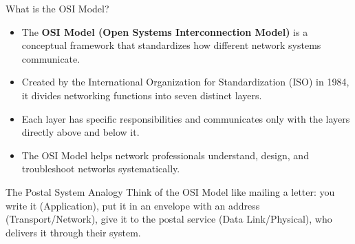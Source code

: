 \documentclass[aspectratio=169]{beamer}
\begin{document}
\begin{frame}{What is the OSI Model?}

\begin{itemize}
    \item The \textbf{OSI Model (Open Systems Interconnection Model)} is a conceptual framework that standardizes how different network systems communicate.
    \item Created by the International Organization for Standardization (ISO) in 1984, it divides networking functions into seven distinct layers.
    \item Each layer has specific responsibilities and communicates only with the layers directly above and below it.
    \item The OSI Model helps network professionals understand, design, and troubleshoot networks systematically.
\end{itemize}

\vspace{0.3cm}

\begin{block}{The Postal System Analogy}
Think of the OSI Model like mailing a letter: you write it (Application), put it in an envelope with an address (Transport/Network), give it to the postal service (Data Link/Physical), who delivers it through their system.
\end{block}

\end{frame}
\end{document}

